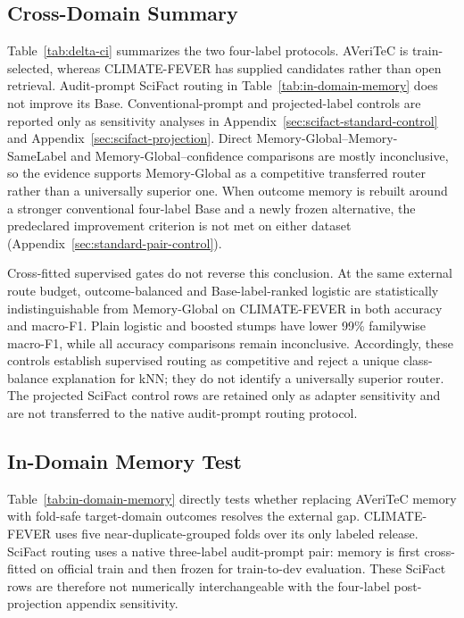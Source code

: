 \documentclass[runningheads]{llncs}
\begin{document}
\subsection{Cross-Domain Summary}

Table~\ref{tab:delta-ci} summarizes the two four-label protocols. AVeriTeC is
train-selected, whereas CLIMATE-FEVER has supplied candidates rather than open
retrieval. Audit-prompt SciFact routing in Table~\ref{tab:in-domain-memory}
does not improve its Base. Conventional-prompt and projected-label controls
are reported only as sensitivity analyses in
Appendix~\ref{sec:scifact-standard-control} and
Appendix~\ref{sec:scifact-projection}. Direct Memory-Global--Memory-SameLabel and
Memory-Global--confidence comparisons are mostly inconclusive, so the evidence supports
Memory-Global as a competitive transferred router rather than a universally superior one.
When outcome memory is rebuilt around a stronger conventional four-label
Base and a newly frozen alternative, the predeclared improvement criterion is
not met on either dataset (Appendix~\ref{sec:standard-pair-control}).

Cross-fitted supervised gates do not reverse this conclusion. At the same
external route budget, outcome-balanced and Base-label-ranked logistic are
statistically indistinguishable from Memory-Global on CLIMATE-FEVER in both
accuracy and macro-F1. Plain logistic and boosted stumps have lower 99\%
familywise macro-F1, while all accuracy comparisons remain inconclusive.
Accordingly, these controls establish supervised routing as competitive and
reject a unique class-balance explanation for kNN; they do not identify a
universally superior router. The projected SciFact control rows are retained
only as adapter sensitivity and are not transferred to the native audit-prompt
routing protocol.

\subsection{In-Domain Memory Test}

Table~\ref{tab:in-domain-memory} directly tests whether replacing AVeriTeC
memory with fold-safe target-domain outcomes resolves the external gap.
CLIMATE-FEVER uses five near-duplicate-grouped folds over its only labeled
release. SciFact routing uses a native three-label audit-prompt pair: memory is
first cross-fitted on official train and then frozen for train-to-dev evaluation.
These SciFact rows are therefore not numerically interchangeable with the
four-label post-projection appendix sensitivity.
\end{document}
